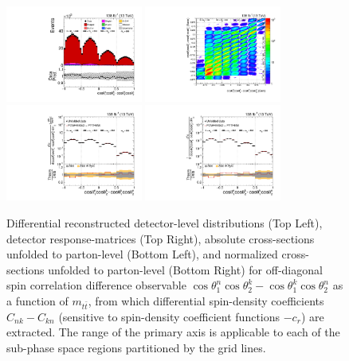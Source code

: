 \clearpage
\begin{figure}[htb]
\begin{center}
 \includegraphics[width=0.40\textwidth]{fig_fullRun2UL/controlplots/combined/Hyp_LLBarCMnk_vs_TTBarMass.pdf}
 \includegraphics[width=0.40\textwidth]{fig_fullRun2UL/unfolding/combined/ResponseMatrix_c_Mnk_mttbar.pdf} \\
 \includegraphics[width=0.40\textwidth]{fig_fullRun2UL/unfolding/combined/UnfoldedResults_c_Mnk_mttbar.pdf}
 \includegraphics[width=0.40\textwidth]{fig_fullRun2UL/unfolding/combined/UnfoldedResultsNorm_c_Mnk_mttbar.pdf} \\
\label{fig:c_Mnk_mttbar}
\caption{Differential reconstructed detector-level distributions (Top Left), detector response-matrices (Top Right), absolute cross-sections unfolded to parton-level (Bottom Left), and normalized cross-sections unfolded to parton-level (Bottom Right) for off-diagonal spin correlation difference observable $\cos\theta_{1}^{n}\cos\theta_{2}^{k}-\cos\theta_{1}^{k}\cos\theta_{2}^{n}$ as a function of $m_{t\bar{t}}$, from which differential spin-density coefficients $C_{nk}-C_{kn}$ (sensitive to spin-density coefficient functions $-c_r$) are extracted.  The range of the primary axis is applicable to each of the sub-phase space regions partitioned by the grid lines.}
\end{center}
\end{figure}

